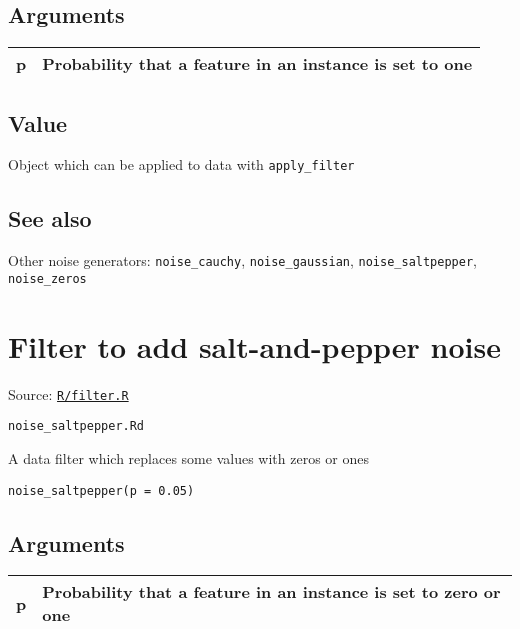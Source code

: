 \hypertarget{arguments}{\subsection{\texorpdfstring{\protect\hyperlink{arguments}{}Arguments}{Arguments}}\label{arguments}}

\begin{longtable}[c]{@{}ll@{}}
\toprule
p & Probability that a feature in an instance is set to
one\tabularnewline
\bottomrule
\end{longtable}

\hypertarget{value}{\subsection{\texorpdfstring{\protect\hyperlink{value}{}Value}{Value}}\label{value}}

Object which can be applied to data with \texttt{apply\_filter}

\hypertarget{see-also}{\subsection{\texorpdfstring{\protect\hyperlink{see-also}{}See
also}{See also}}\label{see-also}}

Other noise generators: \texttt{noise\_cauchy},
\texttt{noise\_gaussian}, \texttt{noise\_saltpepper},
\texttt{noise\_zeros}

\section{Filter to add salt-and-pepper
noise}\label{filter-to-add-salt-and-pepper-noise}

Source:
\href{https://github.com/fdavidcl/ruta/blob/master/R/filter.R}{\texttt{R/filter.R}}

\texttt{noise\_saltpepper.Rd}

A data filter which replaces some values with zeros or ones

\begin{verbatim}
noise_saltpepper(p = 0.05)
\end{verbatim}

\hypertarget{arguments}{\subsection{\texorpdfstring{\protect\hyperlink{arguments}{}Arguments}{Arguments}}\label{arguments}}

\begin{longtable}[c]{@{}ll@{}}
\toprule
p & Probability that a feature in an instance is set to zero or
one\tabularnewline
\bottomrule
\end{longtable}

